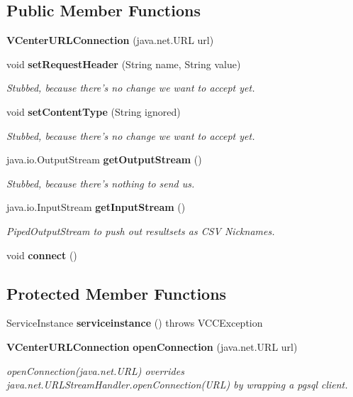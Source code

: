 \subsection*{Public Member Functions}
\begin{DoxyCompactItemize}
\item 
{\bf V\+Center\+U\+R\+L\+Connection} (java.\+net.\+U\+R\+L url)
\item 
void {\bf set\+Request\+Header} (String name, String value)
\begin{DoxyCompactList}\small\item\em Stubbed, because there's no change we want to accept yet. \end{DoxyCompactList}\item 
void {\bf set\+Content\+Type} (String ignored)
\begin{DoxyCompactList}\small\item\em Stubbed, because there's no change we want to accept yet. \end{DoxyCompactList}\item 
java.\+io.\+Output\+Stream {\bf get\+Output\+Stream} ()
\begin{DoxyCompactList}\small\item\em Stubbed, because there's nothing to send us. \end{DoxyCompactList}\item 
java.\+io.\+Input\+Stream {\bf get\+Input\+Stream} ()
\begin{DoxyCompactList}\small\item\em Piped\+Output\+Stream to push out resultsets as C\+S\+V Nicknames. \end{DoxyCompactList}\item 
void {\bf connect} ()
\end{DoxyCompactItemize}
\subsection*{Protected Member Functions}
\begin{DoxyCompactItemize}
\item 
Service\+Instance {\bf serviceinstance} ()  throws V\+C\+C\+Exception     
\item 
{\bf V\+Center\+U\+R\+L\+Connection} {\bf open\+Connection} (java.\+net.\+U\+R\+L url)
\begin{DoxyCompactList}\small\item\em open\+Connection(java.\+net.\+U\+R\+L) overrides java.\+net.\+U\+R\+L\+Stream\+Handler.\+open\+Connection(\+U\+R\+L) by wrapping a pgsql client. \end{DoxyCompactList}\end{DoxyCompactItemize}
